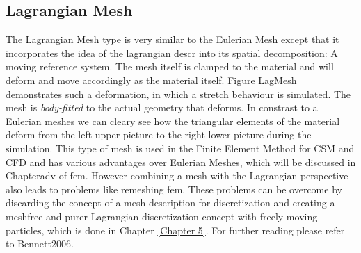 \subsection{Lagrangian Mesh}

The Lagrangian Mesh type is very similar to the Eulerian Mesh except that it incorporates the idea of the lagrangian descr  into its spatial decomposition: A moving reference system. The mesh itself is clamped to the material and will deform and move accordingly as the material itself. Figure LagMesh
demonstrates such a deformation, in which a stretch behaviour is simulated. The mesh is \emph{body-fitted} to the actual geometry that deforms. In constrast to a Eulerian meshes we can cleary see how the triangular elements of the material deform from the left upper picture to the right lower picture during the simulation. This type of mesh is used in the Finite Element Method for CSM and CFD and has various
advantages over Eulerian Meshes, which will be discussed in Chapteradv of fem. However combining a mesh with the Lagrangian perspective also leads to problems
like remeshing fem. These problems can be overcome by discarding the concept of a mesh description for discretization and creating a meshfree and purer Lagrangian discretization concept with freely moving particles, which is done in Chapter \ref{Chapter 5}. For further reading please refer to Bennett2006.


